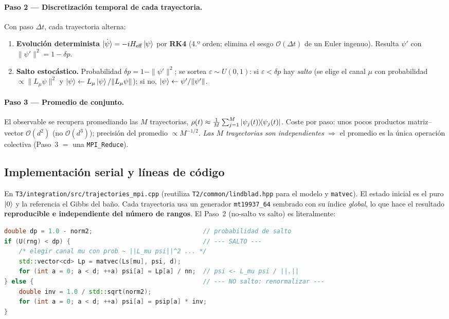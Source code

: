 \paragraph{Paso 2 — Discretización temporal de cada trayectoria.} Con paso
$\Delta t$, cada trayectoria alterna:
\begin{enumerate}[leftmargin=1.6em,itemsep=1pt]
\item \textbf{Evolución determinista} $\dot{\ket\psi}=-iH_{\mathrm{eff}}\ket\psi$ por
\textbf{RK4} (4.º orden; elimina el sesgo $\mathcal{O}(\Delta t)$ de un Euler
ingenuo). Resulta $\psi'$ con $\|\psi'\|^2=1-\delta p$.
\item \textbf{Salto estocástico.} Probabilidad $\delta p=1-\|\psi'\|^2$; se sortea
$\varepsilon\sim U(0,1)$: si $\varepsilon<\delta p$ hay \emph{salto} (se elige el
canal $\mu$ con probabilidad $\propto\|L_\mu\psi\|^2$ y
$\ket\psi\leftarrow L_\mu\ket\psi/\|L_\mu\psi\|$); si no,
$\ket\psi\leftarrow\psi'/\|\psi'\|$.
\end{enumerate}

\paragraph{Paso 3 — Promedio de conjunto.} El observable se recupera promediando
las $M$ trayectorias,
$\rho(t)\approx\frac1M\sum_{j=1}^{M}\dyad{\psi_j(t)}{\psi_j(t)}$. Coste por paso:
unos pocos productos matriz--vector $\mathcal{O}(d^2)$ (no $\mathcal{O}(d^3)$);
precisión del promedio $\propto M^{-1/2}$. \emph{Las $M$ trayectorias son
independientes} $\Rightarrow$ el promedio es la única operación colectiva
(Paso~3 $=$ una \texttt{MPI\_Reduce}).

\subsection{Implementación serial y líneas de código}
En \texttt{T3/integration/src/trajectories\_mpi.cpp} (reutiliza
\texttt{T2/common/lindblad.hpp} para el modelo y \texttt{matvec}). El estado
inicial es el puro $\ket{0}$ y la referencia el Gibbs del baño. Cada trayectoria
usa un generador \texttt{mt19937\_64} sembrado con su índice \emph{global}, lo que
hace el resultado \textbf{reproducible e independiente del número de rangos}. El
Paso~2 (no-salto vs salto) es literalmente:

\begin{lstlisting}[language=C++,caption={Decisión determinista/salto por trayectoria (\texttt{trajectories\_mpi.cpp}). \texttt{psip} es el estado tras el paso RK4 de $H_{\mathrm{eff}}$; \texttt{norm2}$=\|\psi'\|^2$.},label={lst:t3_jump}]
double dp = 1.0 - norm2;                              // probabilidad de salto
if (U(rng) < dp) {                                    // --- SALTO ---
    /* elegir canal mu con prob ~ ||L_mu psi||^2 ... */
    std::vector<cd> Lp = matvec(Ls[mu], psi, d);
    for (int a = 0; a < d; ++a) psi[a] = Lp[a] / nn;  // psi <- L_mu psi / ||.||
} else {                                              // --- NO salto: renormalizar ---
    double inv = 1.0 / std::sqrt(norm2);
    for (int a = 0; a < d; ++a) psi[a] = psip[a] * inv;
}
\end{lstlisting}


